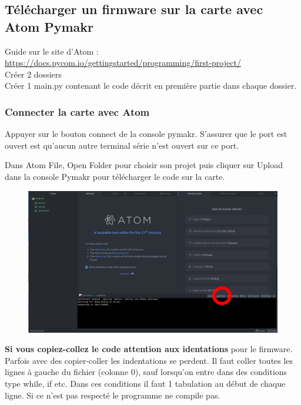 \documentclass{article}
\begin{document}
\subsection{Télécharger un firmware sur la carte avec Atom Pymakr}

Guide sur le site d'Atom : \url{https://docs.pycom.io/gettingstarted/programming/first-project/}\\

Créer 2 dossiers \\
Créer 1 main.py contenant le code décrit en première partie dans chaque dossier. 


\subsubsection{Connecter la carte avec Atom}
Appuyer sur le bouton connect de la console pymakr.
S'assurer que le port est ouvert est qu'aucun autre terminal série n'est ouvert sur ce port.

Dans Atom File, Open Folder pour choisir son projet puis cliquer sur Upload dans la console Pymakr pour télécharger le  code sur la carte. \\



\begin{figure}[H]
\begin{center}
\advance\leftskip-3cm
\advance\rightskip-3cm
\includegraphics[keepaspectratio=true,scale=0.2]{atom_upload.png}
\label{visina8}
\end{center}\end{figure}

\textbf{Si vous copiez-collez le code attention aux identations} pour le firmware. Parfois avec des copier-coller les indentations se perdent.
Il faut coller toutes les lignes à gauche du fichier (colonne 0), sauf lorsqu'on entre dans des conditions type while, if etc. Dans ces conditions il faut 1 tabulation au début de chaque ligne.
Si ce n'est pas respecté le programme ne compile pas. \\
\end{document}
